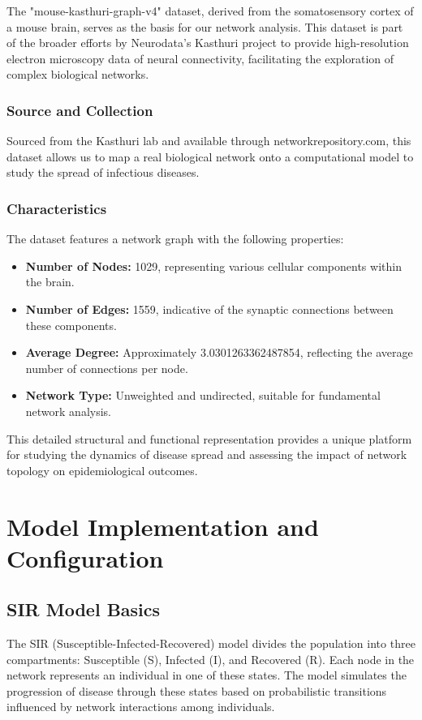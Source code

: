 \documentclass[
	report, %
	11pt, %
]{CSUniSchoolLabReport}
\newcounter{ct}
\begin{document}
The "mouse-kasthuri-graph-v4" dataset, derived from the somatosensory cortex of a mouse brain, serves as the basis for our network analysis. This dataset is part of the broader efforts by Neurodata's Kasthuri project to provide high-resolution electron microscopy data of neural connectivity, facilitating the exploration of complex biological networks.

\subsubsection{Source and Collection}

Sourced from the Kasthuri lab and available through networkrepository.com, this dataset allows us to map a real biological network onto a computational model to study the spread of infectious diseases.

\subsubsection{Characteristics}
		
The dataset features a network graph with the following properties:
\begin{itemize}
	\item \textbf{Number of Nodes:} 1029, representing various cellular components within the brain.
	\item \textbf{Number of Edges:} 1559, indicative of the synaptic connections between these components.
	\item \textbf{Average Degree:} Approximately \num{3.0301263362487854}, reflecting the average number of connections per node.
	\item \textbf{Network Type:} Unweighted and undirected, suitable for fundamental network analysis.
\end{itemize}
\vspace{10pt}

This detailed structural and functional representation provides a unique platform for studying the dynamics of disease spread and assessing the impact of network topology on epidemiological outcomes.

\section{Model Implementation and Configuration}
\subsection{SIR Model Basics}
The SIR (Susceptible-Infected-Recovered) model divides the population into three compartments: Susceptible (S), Infected (I), and Recovered (R). Each node in the network represents an individual in one of these states. The model simulates the progression of disease through these states based on probabilistic transitions influenced by network interactions among individuals.
\end{document}
